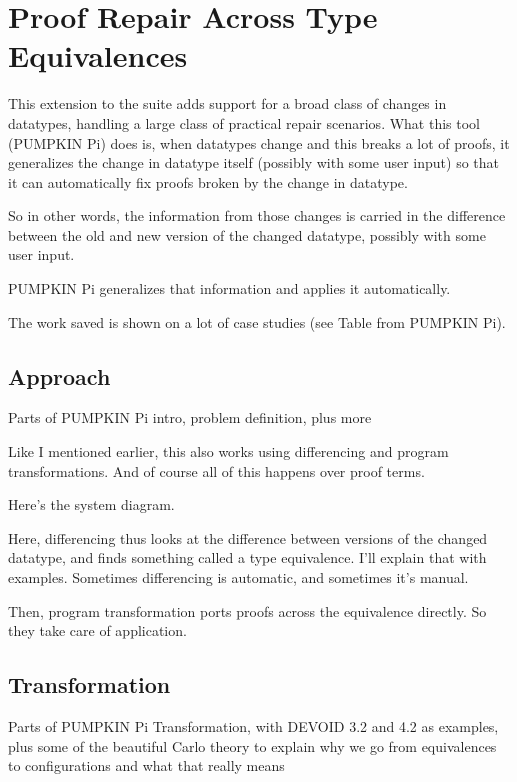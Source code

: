 \chapter{Proof Repair Across Type Equivalences}
\label{chapt:pi}

This extension to the suite adds support for a broad class of changes in datatypes, handling a large class of practical repair scenarios.
What this tool (PUMPKIN Pi) does is, when datatypes change and this breaks a lot of proofs, it generalizes the change in datatype itself (possibly with some user input) so that it can automatically fix proofs broken by the change in datatype. 

So in other words, the information from those changes is carried in the difference between the old and new version of the changed datatype, possibly with some user input.

PUMPKIN Pi generalizes that information and applies it automatically.

The work saved is shown on a lot of case studies (see Table from PUMPKIN Pi).



\section{Approach}

Parts of PUMPKIN Pi intro, problem definition, plus more

Like I mentioned earlier, this also works using differencing and program transformations. And of course all of this happens over proof terms.

Here's the system diagram.

Here, differencing thus looks at the difference between versions of the changed datatype, and finds something called a type equivalence. I'll explain that with examples. Sometimes differencing is automatic, and sometimes it's manual.

Then, program transformation ports proofs across the equivalence directly. So they take care of application.



\section{Transformation}

Parts of PUMPKIN Pi Transformation, with DEVOID 3.2 and 4.2 as examples, plus some of the beautiful Carlo theory to explain why we go from equivalences to configurations and what that really means

